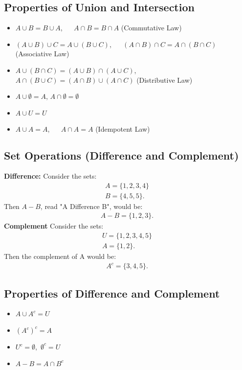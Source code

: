 \documentclass{report}
\begin{document}
    \pagebreak \bigbreak \noindent 
    \subsection{Properties of Union and Intersection}
    \bigbreak \noindent 
    \begin{itemize}
        \item $A \cup B  = B \cup A $, $\quad $ $A \cap B  = B \cap A$ (Commutative Law)
        \item $(A \cup B) \cup C  = A \cup (B\cup C)$, $\quad$ $(A \cap B) \cap C = A \cap (B\cap C) $ (Associative Law)
        \item  $A \cup (B\cap C) = (A \cup B) \cap (A \cup C) $, $\quad$ $A \cap (B \cup C)  = (A \cap B) \cup (A \cap C)$ (Distributive Law)
        \item $A \cup \emptyset  = A$, \quad $A \cap \emptyset = \emptyset $
        \item $A \cup U = U $
        \item $A \cup A = A  $, $\quad$ $A \cap A = A  $ (Idempotent Law)
    \end{itemize}

    \bigbreak \noindent \bigbreak \noindent 
    \subsection{Set Operations (Difference and Complement)}
    \bigbreak \noindent  
    \textbf{Difference:}
    \bigbreak \noindent 
    Consider the sets:
    \begin{align*}
        A = \{1,2,3,4\} \\
        B = \{4,5,5\}
    .\end{align*}
    Then $A-B$, read "A Difference B", would be:
    \begin{align*}
        A-B = \{1,2,3\}
    .\end{align*}
    \bigbreak \noindent 
    \textbf{Complement}
    \bigbreak \noindent 
    Consider the sets:
    \begin{align*}
        U = \{1,2,3,4,5\}  \\
        A = \{1,2\}
    .\end{align*}
    \bigbreak \noindent 
    Then the complement of A would be:
    \begin{align*}
        A^{c} = \{3,4,5\}
    .\end{align*}

    \pagebreak \bigbreak \noindent 
    \subsection{Properties of Difference and Complement}
    \bigbreak \noindent 
    \begin{itemize}
        \item $A \cup A^{c} = U$ 
        \item $(A^{c})^{c} = A$
        \item $U^{c}  = \emptyset$,\ $\emptyset^{c} = U $
        \item $A-B  = A \cap B^{c}$
    \end{itemize}
\end{document}
